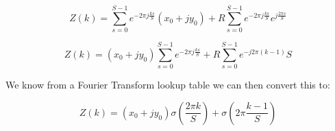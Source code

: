 \documentclass{article}
\begin{document}
\begin{equation}
    Z(k) = \sum^{S-1}_{s=0} e^{-2\pi j \frac{ks}{S}} (x_0 + jy_0) + R\sum^{S-1}_{s=0} e^{-2\pi j \frac{ks}{S}} e^{j\frac{2\pi s}{S}}
\end{equation}

\begin{equation}
    Z(k) = (x_0 + jy_0) \sum^{S-1}_{s=0} e^{-2\pi j \frac{ks}{S}}  + R\sum^{S-1}_{s=0} e^{-j 2 \pi (k-1)} S
\end{equation}

\noindent We know from a Fourier Transform lookup table we can then convert this to:

\begin{equation}
    Z(k) = (x_0+jy_0)\sigma(\frac{2\pi k}{S}) + \sigma(2\pi \frac{k-1}{S})
\end{equation}
\end{document}
